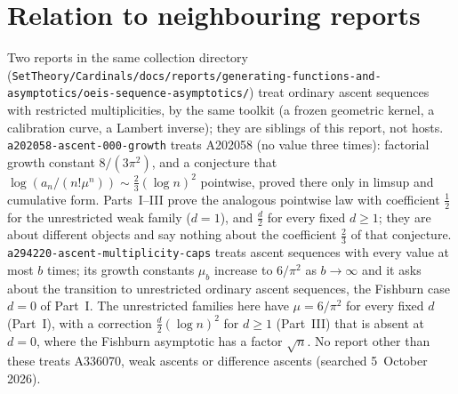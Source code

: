 \documentclass[11pt,a4paper]{article}
\newcommand{\file}[1]{\nolinkurl{#1}}
\theoremstyle{remark}\newtheorem{remark}[theorem]{Remark}
\numberwithin{equation}{section}
\begin{document}
\section*{Relation to neighbouring reports}\label{wasc:sec:neighbours}
Two reports in the same collection directory (\file{SetTheory/Cardinals/docs/reports/generating-functions-and-asymptotics/}\allowbreak\file{oeis-sequence-asymptotics/}) treat ordinary ascent sequences with restricted multiplicities, by the same toolkit (a frozen geometric kernel, a calibration curve, a Lambert inverse); they are siblings of this report, not hosts. \file{a202058-ascent-000-growth} treats A202058 (no value three times): factorial growth constant $8/(3\pi^2)$, and a conjecture that $\log(a_n/(n!\mu^n))\sim\frac23(\log n)^2$ pointwise, proved there only in limsup and cumulative form. Parts~I--III prove the analogous pointwise law with coefficient $\frac12$ for the unrestricted weak family ($d=1$), and $\frac d2$ for every fixed $d\ge1$; they are about different objects and say nothing about the coefficient $\frac23$ of that conjecture. \file{a294220-ascent-multiplicity-caps} treats ascent sequences with every value at most $b$ times; its growth constants $\mu_b$ increase to $6/\pi^2$ as $b\to\infty$ and it asks about the transition to unrestricted ordinary ascent sequences, the Fishburn case $d=0$ of Part~I. The unrestricted families here have $\mu=6/\pi^2$ for every fixed $d$ (Part~I), with a correction $\frac d2(\log n)^2$ for $d\ge1$ (Part~III) that is absent at $d=0$, where the Fishburn asymptotic has a factor $\sqrt n$. No report other than these treats A336070, weak ascents or difference ascents (searched 5~October 2026).

\clearpage
\end{document}
